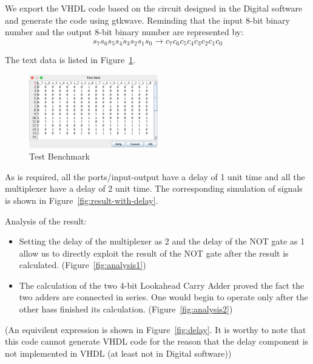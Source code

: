 \documentclass[conference]{IEEEtran}
\begin{document}
We export the VHDL code based on the circuit designed in the Digital software and generate the code using gtkwave.
Reminding that the input 8-bit binary number and the output 8-bit binary number are represented by:
\begin{equation}
    \overline{s_7s_6s_5s_4s_3s_2s_1s_0} \longrightarrow \overline{c_7c_6c_5c_4c_3c_2c_1c_0}
\end{equation}


The text data is listed in Figure~\ref{fig:test-benchmark}.

\begin{figure}[h!]
    \centering
    \includegraphics[width=0.5\textwidth]{assets/test-data.png}
    \caption{Test Benchmark}
    \label{fig:test-benchmark}
\end{figure}


As is required, all the ports/input-output have a delay of 1 unit time and all the multiplexer have a delay of 2 unit time.
The corresponding simulation of signals is shown in Figure~\ref{fig:result-with-delay}.


Analysis of the result:
\begin{itemize}
    \item Setting the delay of the multiplexer as 2 and the delay of the NOT gate as 1 allow us to directly exploit the result of the NOT gate after the result is calculated. (Figure~\ref{fig:analysis1})
    \item The calculation of the two 4-bit Lookahead Carry Adder proved the fact the two adders are connected in series. One would begin to operate only after the other hass finished its calculation. (Figure~\ref{fig:analysis2})
\end{itemize}

(An equivilent expression is shown in Figure~\ref{fig:delay}. It is worthy to note that this code cannot generate VHDL code for the reason that the delay component is not implemented in VHDL (at least not in Digital software))
\end{document}
